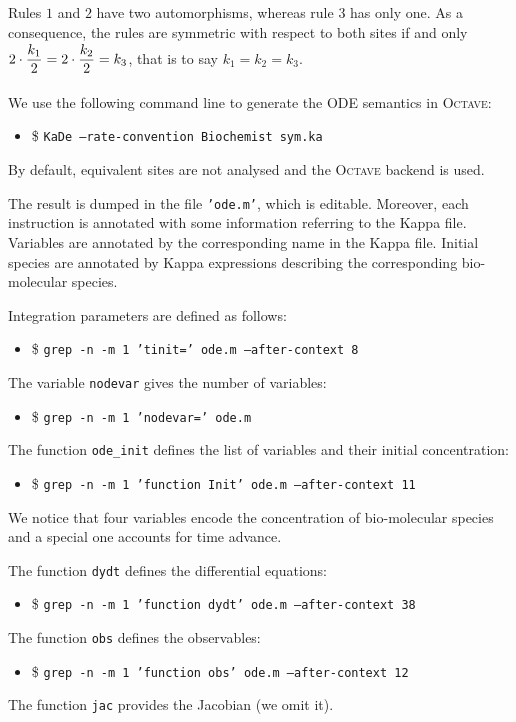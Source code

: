 \documentclass[11pt]{book}
\def\ttt#1{\texttt{#1}}
\def\ITE#1{\begin{itemize}#1\end{itemize}}
\begin{document}
Rules $1$ and $2$ have two automorphisms, whereas rule $3$ has only one.
As a consequence, the rules are symmetric with respect to both sites if and only $2\cdot\frac{\strut \displaystyle k_1}{\strut \displaystyle 2}=2\cdot\frac{\strut \displaystyle k_2}{\strut \displaystyle 2}=k_3$, that is to say $k_1=k_2=k_3$.


We use the following command line to generate the ODE semantics in \textsc{Octave}:
\ITE{
\item[\$] \ttt{KaDe --rate-convention Biochemist sym.ka}}

By default, equivalent sites are not analysed and the \textsc{Octave} backend is used.

The result is dumped in the file \texttt{'ode.m'}, which  is editable. Moreover, each instruction is annotated with some information referring to the Kappa file. Variables are annotated by the corresponding name in the Kappa file. Initial species are annotated by Kappa expressions describing the corresponding bio-molecular species.


\lstset{numbers=none}

Integration parameters are defined as follows:
\ITE{
\item[\$] \ttt{grep -n -m 1 'tinit=' ode.m --after-context 8}}


The variable \texttt{nodevar} gives the number of variables:
\ITE{
\item[\$] \ttt{grep -n -m 1 'nodevar=' ode.m}}


The function \texttt{ode\_init} defines the list of variables and their initial concentration:
\ITE{
\item[\$] \ttt{grep -n -m 1 'function Init' ode.m --after-context 11 }}

We notice that four variables encode the concentration of bio-molecular species and a special one accounts for time advance.

The function \texttt{dydt} defines the differential equations:
\ITE{
\item[\$] \ttt{grep -n -m 1 'function dydt' ode.m --after-context 38}}


The function \texttt{obs} defines the observables:
\ITE{
\item[\$] \ttt{grep -n -m 1 'function obs' ode.m --after-context 12}}


The function \texttt{jac} provides the Jacobian (we omit it).
\end{document}
